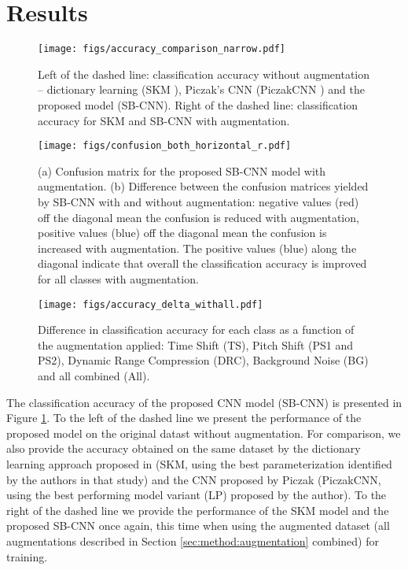 \documentclass[journal,pdf]{IEEEtran}
\begin{document}
\section{Results}
\label{sec:results}

\begin{figure}[!t]
\centering
\texttt{[image: figs/accuracy\_comparison\_narrow.pdf]}
\caption{Left of the dashed line: classification accuracy without augmentation -- dictionary learning (SKM \cite{Salamon:UnsupervisedUrban:ICASSP:15}), Piczak's CNN (PiczakCNN \cite{Piczak:EnvSoundCNN:MLSP:15}) and the proposed model (SB-CNN). Right of the dashed line: classification accuracy for SKM and SB-CNN with augmentation.}
\label{fig:accuracybox}
\end{figure}

\begin{figure}[!t]
\centering
\texttt{[image: figs/confusion\_both\_horizontal\_r.pdf]}
\caption{(a) Confusion matrix for the proposed SB-CNN model with augmentation.
(b) Difference between the confusion matrices yielded by SB-CNN with and without augmentation: negative values (red) off the diagonal mean the confusion is reduced with augmentation, positive values (blue) off the diagonal mean the confusion is increased with augmentation. The positive values (blue) along the diagonal indicate that overall the classification accuracy is improved for all classes with augmentation.}
\label{fig:confusion}
\end{figure}

\begin{figure}[!t]
\centering
\texttt{[image: figs/accuracy\_delta\_withall.pdf]}
\caption{Difference in classification accuracy for each class as a function of the augmentation applied: Time Shift (TS), Pitch Shift (PS1 and PS2), Dynamic Range Compression (DRC), Background Noise (BG) and all combined (All).}
\label{fig:accuracydelta}
\end{figure}

The classification accuracy of the proposed CNN model (SB-CNN) is presented in Figure \ref{fig:accuracybox}. To the left of the dashed line we present the performance of the proposed model on the original datast without augmentation. For comparison, we also provide the accuracy obtained on the same dataset by the dictionary learning approach proposed in \cite{Salamon:UnsupervisedUrban:ICASSP:15} (SKM, using the best parameterization identified by the authors in that study) and the CNN proposed by Piczak \cite{Piczak:EnvSoundCNN:MLSP:15} (PiczakCNN, using the best performing model variant (LP) proposed by the author). 
To the right of the dashed line we provide the performance of the SKM model and the proposed SB-CNN once again, this time when using the augmented dataset (all augmentations described in Section \ref{sec:method:augmentation} combined) for training.
\end{document}

